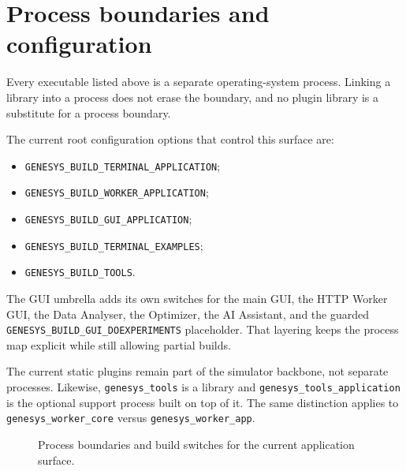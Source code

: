 \section{Process boundaries and configuration}
\label{sec:application-architecture-process-boundaries}

Every executable listed above is a separate operating-system process. Linking a
library into a process does not erase the boundary, and no plugin library is a
substitute for a process boundary.

The current root configuration options that control this surface are:
\begin{itemize}
\item \texttt{GENESYS\_BUILD\_TERMINAL\_APPLICATION};
\item \texttt{GENESYS\_BUILD\_WORKER\_APPLICATION};
\item \texttt{GENESYS\_BUILD\_GUI\_APPLICATION};
\item \texttt{GENESYS\_BUILD\_TERMINAL\_EXAMPLES};
\item \texttt{GENESYS\_BUILD\_TOOLS}.
\end{itemize}

The GUI umbrella adds its own switches for the main GUI, the HTTP Worker GUI,
the Data Analyser, the Optimizer, the AI Assistant, and the guarded
\texttt{GENESYS\_BUILD\_GUI\_DOEXPERIMENTS} placeholder. That layering keeps
the process map explicit while still allowing partial builds.

The current static plugins remain part of the simulator backbone, not separate
processes. Likewise, \texttt{genesys\_tools} is a library and
\texttt{genesys\_tools\_application} is the optional support process built on
top of it. The same distinction applies to \texttt{genesys\_worker\_core}
versus \texttt{genesys\_worker\_app}.

\begin{figure}[htbp]
\centering
\caption{Process boundaries and build switches for the current application surface.}
\label{fig:application-architecture-process-boundaries}
\end{figure}

